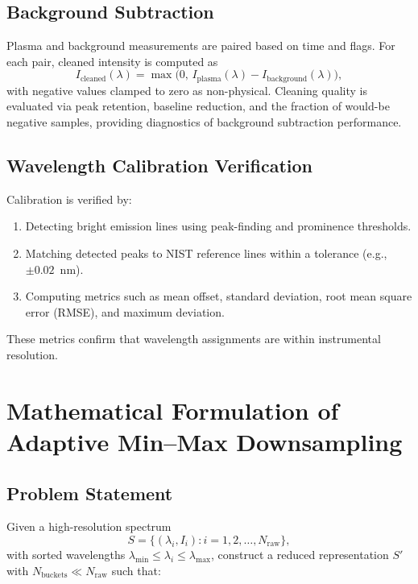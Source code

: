 \documentclass[12pt,a4paper]{article}
\begin{document}
\subsection{Background Subtraction}

Plasma and background measurements are paired based on time and flags. For each pair, cleaned intensity is computed as
\[
I_{\text{cleaned}}(\lambda) = \max\bigl(0,\, I_{\text{plasma}}(\lambda) - I_{\text{background}}(\lambda)\bigr),
\]
with negative values clamped to zero as non-physical. Cleaning quality is evaluated via peak retention, baseline reduction, and the fraction of would-be negative samples, providing diagnostics of background subtraction performance.

\subsection{Wavelength Calibration Verification}

Calibration is verified by:

\begin{enumerate}[nosep]
  \item Detecting bright emission lines using peak-finding and prominence thresholds.
  \item Matching detected peaks to NIST reference lines within a tolerance (e.g., \(\pm 0.02\)~nm).
  \item Computing metrics such as mean offset, standard deviation, root mean square error (RMSE), and maximum deviation.
\end{enumerate}

These metrics confirm that wavelength assignments are within instrumental resolution.

\section{Mathematical Formulation of Adaptive Min--Max Downsampling}
\label{sec:math}

\subsection{Problem Statement}

Given a high-resolution spectrum
\[
S = \{(\lambda_i, I_i) : i = 1, 2, \ldots, N_{\text{raw}}\}, 
\]
with sorted wavelengths \(\lambda_{\min} \le \lambda_i \le \lambda_{\max}\), construct a reduced representation \(S'\) with \(N_{\text{buckets}} \ll N_{\text{raw}}\) such that:
\end{document}
